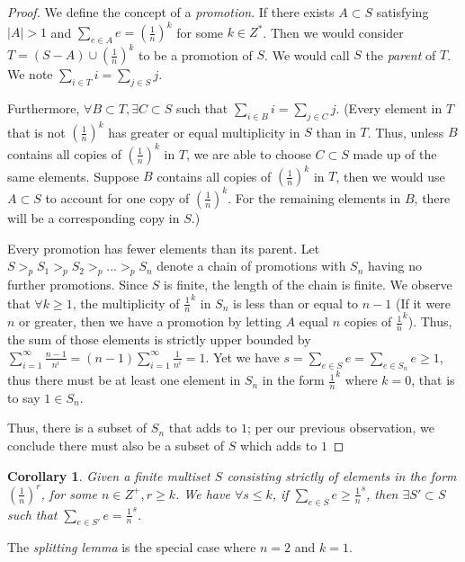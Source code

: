 \documentclass{article}
\theoremstyle{plain}
\newtheorem*{cor}{Corollary}
\theoremstyle{definition}
\theoremstyle{remark}
\begin{document}
\begin{proof}
	We define the concept of a \textit{promotion}. If there exists $A \subset S$ satisfying $|A| > 1$ and $\sum_{e \in A} e = (\frac{1}{n})^k$ for some $k \in Z^*$. Then we would consider $T = (S-A) \cup {(\frac{1}{n})^k}$ to be a promotion of $S$. We would call $S$ the \textit{parent} of $T$. We note $\sum_{i \in T} i = \sum_{j \in S} j$. 
	
	Furthermore, $\forall B \subset T, \exists C \subset S$ such that $\sum_{i \in B} i = \sum_{j \in C} j$. (Every element in $T$ that is not $(\frac{1}{n})^k$ has greater or equal multiplicity in $S$ than in $T$. Thus, unless $B$ contains all copies of $(\frac{1}{n})^k$ in $T$, we are able to choose $C \subset S$ made up of the same elements. Suppose $B$ contains all copies of $(\frac{1}{n})^k$ in $T$, then we would use $A \subset S$ to account for one copy of $(\frac{1}{n})^k$. For the remaining elements in $B$, there will be a corresponding copy in $S$.) 
	
	
	Every promotion has fewer elements than its parent. Let $S >_p S_1 >_p S_2 >_p ... >_p S_n$ denote a chain of promotions with $S_n$ having no further promotions. Since $S$ is finite, the length of the chain is finite. We observe that $\forall k \ge 1$, the multiplicity of $\frac{1}{n}^k$ in $S_n$ is less than or equal to $n-1$ (If it were $n$ or greater, then we have a promotion by letting $A$ equal $n$ copies of $\frac{1}{n}^k$). Thus, the sum of those elements is strictly upper bounded by $\sum_{i=1}^\infty \frac{n-1}{n^i} = (n-1) \sum_{i=1}^\infty \frac{1}{n^i} = 1$. Yet we have $s = \sum_{e \in S} e =  \sum_{e \in S_n} e \ge 1$, thus there must be at least one element in $S_n$ in the form $\frac{1}{n}^k$ where $k = 0$, that is to say $1 \in S_n$. 
	
	Thus, there is a subset of $S_n$ that adds to $1$; per our previous observation, we conclude there must also be a subset of $S$ which adds to $1$
\end{proof}

\begin{cor}
	Given a finite multiset $S$ consisting strictly of elements in the form $(\frac{1}{n})^r$, for some $n \in Z^+, r \ge k$. We have $\forall  s \le k$, if $\sum_{e \in S} e \ge {\frac{1}{n}}^s$, then $\exists S' \subset S$ such that $ \sum_{e \in S'} e  = {\frac{1}{n}}^s$.
\end{cor}

The \textit{splitting lemma} is the special case where $n=2$ and $k=1$. 
\end{document}
